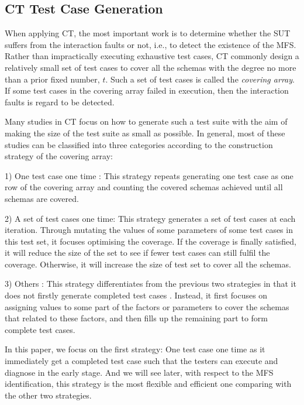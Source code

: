 \documentclass{sig-alternate}
\begin{document}
\subsection{CT Test Case Generation}
When applying CT, the most important work is to determine whether the SUT suffers from the interaction faults or not, i.e., to  detect the existence of the MFS. Rather than impractically executing exhaustive test cases, CT commonly design a relatively small set of test cases to cover all the schemas with the degree no more than a prior fixed number, $t$. Such a set of test cases is called the \emph{covering array}.  If some test cases in the covering array failed in execution, then the interaction faults is regard to be detected.

Many studies in CT focus on how to generate such a test suite with the aim of making the size of the test suite as small as possible. In general, most of these studies can be classified into three categories according to the construction strategy of the covering array:

1) One test case one time : This strategy repeats generating one test case as one row of the covering array and counting the covered schemas achieved until all schemas are covered.


2) A  set of test cases one time:  This strategy generates a set of test cases at each iteration. Through mutating the values of some parameters of some test cases in this test set, it focuses optimising the coverage. If the coverage is finally satisfied, it will reduce the size of the set to see if fewer test cases can still fulfil the coverage. Otherwise, it will increase the size of test set to cover all the schemas\cite{cohen2003augmenting}.

3) Others :  This strategy differentiates from the previous two strategies in that it does not firstly generate completed test cases \cite{lei2008ipog}. Instead, it first focuses on assigning values to some part of the factors or parameters to cover the schemas that related to these factors, and then fills up the remaining part to form complete test cases.

In this paper, we focus on the first strategy: One test case one time as it immediately get a completed test case such that the testers can execute and diagnose in the early stage. And we will see later, with respect to the MFS identification, this strategy is the most flexible and efficient one comparing with the other two strategies.
\end{document}
